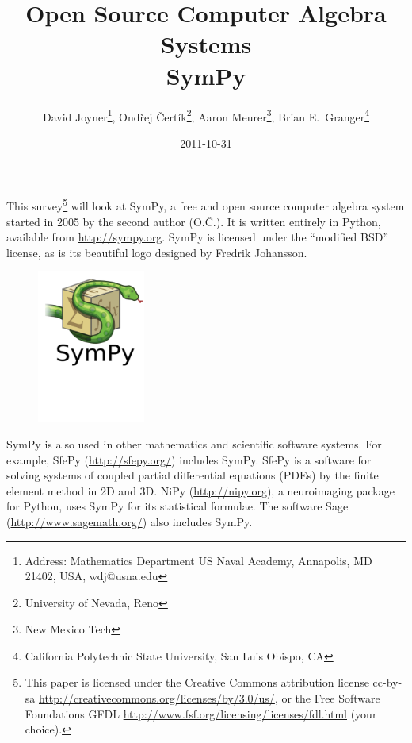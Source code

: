 \documentclass[12pt]{article}
\def\OC{O.Č.}
\begin{document}
\author{David Joyner\thanks{Address: Mathematics Department
US Naval Academy, Annapolis, MD 21402, USA, wdj@usna.edu},
Ondřej Čertík\thanks{University of Nevada, Reno},
Aaron Meurer\thanks{New Mexico Tech},
Brian E.~Granger\thanks{California Polytechnic State University, San Luis Obispo, CA}}
\title{{\small{Open Source Computer Algebra Systems}}\\ {\LARGE{SymPy}}}

\date{2011-10-31}

\maketitle




This survey\footnote{This paper is licensed under the
Creative Commons attribution license cc-by-sa
\url{http://creativecommons.org/licenses/by/3.0/us/},
or the Free Software Foundations GFDL
\url{http://www.fsf.org/licensing/licenses/fdl.html}
(your choice).}
will look at SymPy, a free and open source computer algebra
system started in 2005 by the second author (\OC).
It is written entirely in Python, available from
\url{http://sympy.org}.
SymPy is licensed under the ``modified BSD'' license, as is its
beautiful logo designed by Fredrik Johansson.

\begin{figure}[h!]
\begin{center}
\includegraphics[height=5cm]{sympy-snake-icon.pdf}
\end{center}
\end{figure}

\vskip-2cm

SymPy is also used in other mathematics and scientific software systems.
For example, SfePy (\url{http://sfepy.org/}) includes SymPy. SfePy is a
software for solving systems of coupled partial differential equations
(PDEs) by the finite element method in 2D and 3D.  NiPy
(\url{http://nipy.org}), a neuroimaging package for Python, uses SymPy
for its statistical formulae. The software Sage
(\url{http://www.sagemath.org/}) also includes SymPy.
\end{document}
